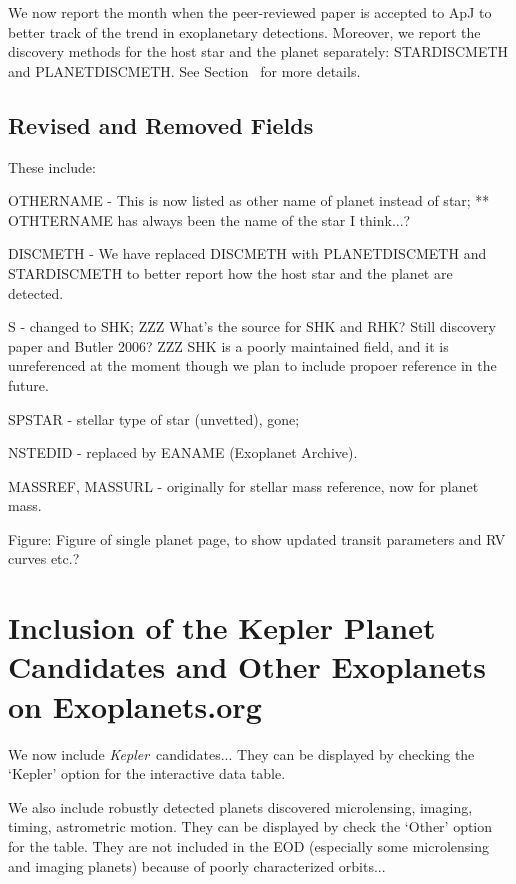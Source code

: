 \documentclass[11pt,preprint]{aastex}
\def\kepler{\textit{Kepler}}
\begin{document}
\begin{CJK*}{UTF8}{gbsn}
We now report the month when the peer-reviewed paper is accepted to
ApJ to better track of the trend in exoplanetary detections. Moreover,
we report the discovery methods for the host star and the planet
separately: STARDISCMETH and PLANETDISCMETH. See Section~ for more
details.  


\subsection{Revised and Removed Fields}

These include:

OTHERNAME - This is now listed as other name of planet instead of star;
** OTHTERNAME has always been the name of the star I think...?

DISCMETH - We have replaced DISCMETH with PLANETDISCMETH and STARDISCMETH to better report how the host star and the planet are detected. 

S - changed to SHK; ZZZ What's the source for SHK and RHK? Still discovery
paper and Butler 2006? ZZZ SHK is a poorly maintained field, and it is
unreferenced at the moment though we plan to include propoer reference
in the future.

SPSTAR - stellar type of star (unvetted), gone;

NSTEDID - replaced by EANAME (Exoplanet Archive).

MASSREF, MASSURL - originally for stellar mass reference, now for planet mass.

Figure: Figure of single planet page, to show updated transit
parameters and RV curves etc.?


\section{Inclusion of the Kepler Planet Candidates and Other Exoplanets on Exoplanets.org}\label{sec:kepler}

We now include \kepler\ candidates... They can be displayed by
checking the `Kepler' option for the interactive data table.

We also include robustly detected planets discovered microlensing,
imaging, timing, astrometric motion. They can be displayed by check
the `Other' option for the table. They are not included in the EOD
(especially some microlensing and imaging planets) because of poorly
characterized orbits...


\end{CJK*}
\end{document}
